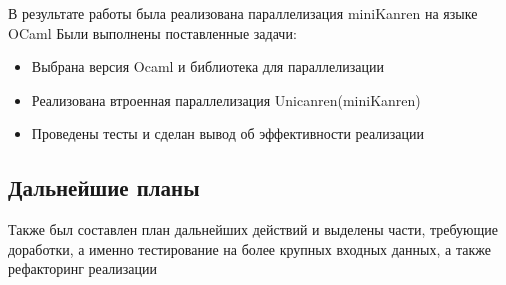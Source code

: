 

В результате работы была реализована параллелизация miniKanren на языке OCaml
Были выполнены поставленные задачи:


\begin{itemize}
\item Выбрана версия Ocaml и библиотека для параллелизации
\item Реализована втроенная параллелизация Unicanren(miniKanren)
\item Проведены тесты и сделан вывод об эффективности реализации
\end{itemize}


\subsection{ \textbf{Дальнейшие планы}}

Также был составлен план дальнейших действий и выделены части,
требующие доработки, а именно тестирование на более крупных входных данных, а также рефакторинг реализации



